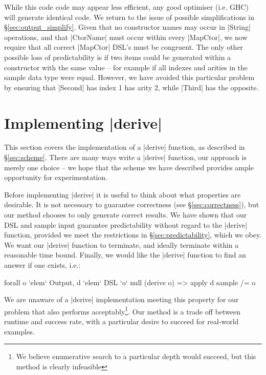 \documentclass[preprint,draft]{sigplanconf}
\begin{document}
While this code code may appear less efficient, any good optimiser (i.e. GHC) will generate identical code. We return to the issue of possible simplifications in \S\ref{sec:output_simplify}. Given that no constructor names may occur in |String| operations, and that |CtorName| must occur within every |MapCtor|, we now require that all correct |MapCtor| DSL's must be congruent. The only other possible loss of predictability is if two items could be generated within a constructor with the same value -- for example if all indexes and arities in the sample data type were equal. However, we have avoided this particular problem by ensuring that |Second| has index 1 has arity 2, while |Third| has the opposite.


\section{Implementing |derive|}
\label{sec:guess}

This section covers the implementation of a |derive| function, as described in \S\ref{sec:scheme}. There are many ways write a |derive| function, our approach is merely one choice -- we hope that the scheme we have described provides ample opportunity for experimentation.

Before implementing |derive| it is useful to think about what properties are desirable. It is not necessary to guarantee correctness (see \S\ref{sec:correctness}), but our method chooses to only generate correct results. We have shown that our DSL and sample input guarantee predictability without regard to the |derive| function, provided we meet the restrictions in \S\ref{sec:predictability}, which we obey. We want our |derive| function to terminate, and ideally terminate within a reasonable time bound. Finally, we would like the |derive| function to find an answer if one exists, i.e.:

\ignore\begin{code}
forall o `elem` Output, d `elem` DSL `o` null (derive o) => apply d sample /= o
\end{code}

We are unaware of a |derive| implementation meeting this property for our problem that also performs acceptably\footnote{We believe enumerative search to a particular depth would succeed, but this method is clearly infeasible}. Our method is a trade off between runtime and success rate, with a particular desire to succeed for real-world examples.
\end{document}
